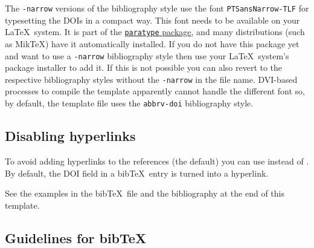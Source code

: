 \documentclass[journal]{vgtc}                     %
\begin{document}
The \verb|-narrow| versions of the bibliography style use the font \verb|PTSansNarrow-TLF| for typesetting the DOIs in a compact way.
This font needs to be available on your \LaTeX\ system.
It is part of the \href{https://www.ctan.org/pkg/paratype}{\texttt{paratype} package}, and many distributions (such as MikTeX) have it automatically installed.
If you do not have this package yet and want to use a \verb|-narrow| bibliography style then use your \LaTeX\ system's package installer to add it.
If this is not possible you can also revert to the respective bibliography styles without the \verb|-narrow| in the file name.
DVI-based processes to compile the template apparently cannot handle the different font so, by default, the template file uses the \texttt{abbrv-doi} bibliography style.

\subsection{Disabling hyperlinks}

To avoid adding hyperlinks to the references (the default) you can use \verb|| instead of \verb||.
By default, the DOI field in a bib\TeX\ entry is turned into a hyperlink.

See the examples in the bib\TeX\ file and the bibliography at the end of this template.

\subsection{Guidelines for bibTeX}
\end{document}
